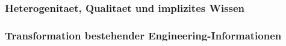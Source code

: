 \subsubsection{Heterogenitaet, Qualitaet und implizites Wissen}
\label{sec:heterogeneous_legacy_information}

%
%
%
%
%
%
%
%


\subsubsection{Transformation bestehender Engineering-Informationen}
\label{sec:legacy_transformation}

%
%
%
%
%
%
%
%


